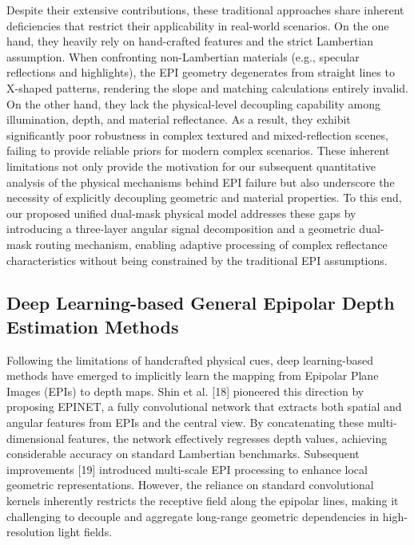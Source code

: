 Despite their extensive contributions, these traditional approaches share inherent deficiencies that restrict their applicability in real-world scenarios. On the one hand, they heavily rely on hand-crafted features and the strict Lambertian assumption. When confronting non-Lambertian materials (e.g., specular reflections and highlights), the EPI geometry degenerates from straight lines to X-shaped patterns, rendering the slope and matching calculations entirely invalid. On the other hand, they lack the physical-level decoupling capability among illumination, depth, and material reflectance. As a result, they exhibit significantly poor robustness in complex textured and mixed-reflection scenes, failing to provide reliable priors for modern complex scenarios. These inherent limitations not only provide the motivation for our subsequent quantitative analysis of the physical mechanisms behind EPI failure but also underscore the necessity of explicitly decoupling geometric and material properties. To this end, our proposed unified dual-mask physical model addresses these gaps by introducing a three-layer angular signal decomposition and a geometric dual-mask routing mechanism, enabling adaptive processing of complex reflectance characteristics without being constrained by the traditional EPI assumptions.

\subsection{Deep Learning-based General Epipolar Depth Estimation Methods}

Following the limitations of handcrafted physical cues, deep learning-based methods have emerged to implicitly learn the mapping from Epipolar Plane Images (EPIs) to depth maps. Shin et al. [18] pioneered this direction by proposing EPINET, a fully convolutional network that extracts both spatial and angular features from EPIs and the central view. By concatenating these multi-dimensional features, the network effectively regresses depth values, achieving considerable accuracy on standard Lambertian benchmarks. Subsequent improvements [19] introduced multi-scale EPI processing to enhance local geometric representations. However, the reliance on standard convolutional kernels inherently restricts the receptive field along the epipolar lines, making it challenging to decouple and aggregate long-range geometric dependencies in high-resolution light fields.


